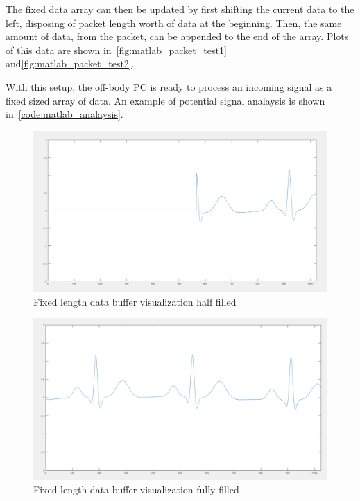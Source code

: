 The fixed data array can then be updated by first shifting the current data to the left, disposing of packet length worth of data at the beginning.
Then, the same amount of data, from the packet, can be appended to the end of the array.
Plots of this data are shown in~\autoref{fig:matlab_packet_test1} and\autoref{fig:matlab_packet_test2}.

With this setup, the off-body PC is ready to process an incoming signal as a fixed sized array of data.
An example of potential signal analaysis is shown in~\autoref{code:matlab_analaysis}.

\begin{figure}[!ht]
  \caption{Fixed length data buffer visualization half filled}\label{fig:matlab_packet_test1}
  \centering
  \includegraphics[width=1\columnwidth]{chapters/development/MATLAB/HALF_FILLED}
\end{figure}

\begin{figure}[!ht]
  \caption{Fixed length data buffer visualization fully filled}\label{fig:matlab_packet_test2}
  \centering
  \includegraphics[width=1\columnwidth]{chapters/development/MATLAB/FULL_FILLED}
\end{figure}


